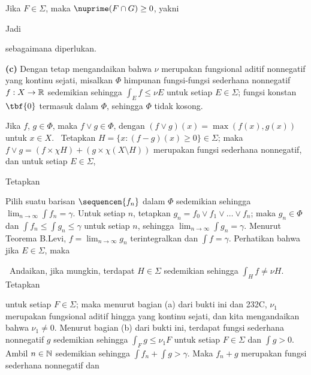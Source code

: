 {Jika $F\in\Sigma$, maka $\nuprime(F\cap G)\ge 0$, yakni


\noindent Jadi


\noindent sebagaimana diperlukan.\ \Qed

\medskip

{\bf (c)} Dengan tetap mengandaikan bahwa $\nu$ merupakan fungsional
aditif nonnegatif yang kontinu sejati, misalkan $\Phi$ himpunan
fungsi-fungsi sederhana nonnegatif $f:X\to\Bbb R$ sedemikian sehingga
$\int_Ef\le\nu E$ untuk setiap $E\in\Sigma$; fungsi konstan $\tbf{0}$
termasuk dalam $\Phi$, sehingga $\Phi$ tidak kosong.

Jika $f$, $g\in\Phi$, maka $f\vee g\in\Phi$, dengan $(f\vee
g)(x)=\max(f(x),g(x))$ untuk $x\in X$. \Prf\ Tetapkan
$H=\{x:(f-g)(x)\ge 0\}\in\Sigma$; maka $f\vee g=(f\times\chi
H)+(g\times\chi(X\setminus H))$ merupakan fungsi sederhana nonnegatif,
dan untuk setiap $E\in\Sigma$,


Tetapkan


\noindent Pilih suatu barisan $\sequencen{f_n}$ dalam $\Phi$ sedemikian
sehingga $\lim_{n\to\infty}\int f_n=\gamma$. Untuk setiap $n$, tetapkan
$g_n=f_0\vee f_1\vee\ldots\vee f_n$; maka $g_n\in\Phi$ dan
$\int f_n\le\int g_n\le\gamma$ untuk setiap $n$, sehingga
$\lim_{n\to\infty}\int g_n=\gamma$. Menurut Teorema B.Levi,
$f=\lim_{n\to\infty}g_n$ terintegralkan dan $\int f=\gamma$. Perhatikan
bahwa jika $E\in\Sigma$, maka



\vthsp\Quer\ Andaikan, jika mungkin, terdapat $H\in\Sigma$ sedemikian
sehingga $\int_Hf\ne\nu H$. Tetapkan


\noindent untuk setiap $F\in\Sigma$; maka menurut bagian (a) dari bukti ini
dan 232C, $\nu_1$ merupakan fungsional aditif hingga yang kontinu sejati,
dan kita mengandaikan bahwa $\nu_1\ne 0$. Menurut bagian (b) dari bukti ini,
terdapat fungsi sederhana nonnegatif $g$ sedemikian sehingga
$\int_Fg\le\nu_1F$ untuk setiap $F\in\Sigma$ dan $\int g>0$. Ambil
$n\in\Bbb N$ sedemikian sehingga $\int f_n+\int g>\gamma$. Maka
$f_n+g$ merupakan fungsi sederhana nonnegatif dan

}
